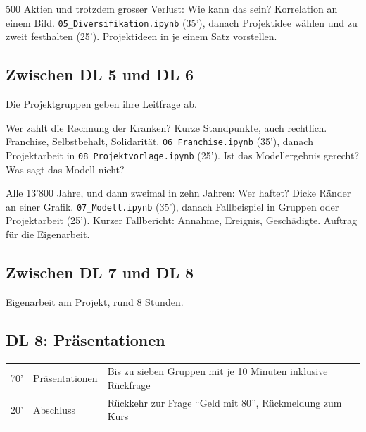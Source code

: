 {500 Aktien und trotzdem grosser Verlust: Wie kann das sein?}
{Korrelation an einem Bild.}
{\texttt{05\_Diversifikation.ipynb} (35'), danach Projektidee wählen und zu zweit festhalten (25').}
{Projektideen in je einem Satz vorstellen.}

\subsection*{Zwischen DL 5 und DL 6}
Die Projektgruppen geben ihre Leitfrage ab.

{Wer zahlt die Rechnung der Kranken? Kurze Standpunkte, auch rechtlich.}
{Franchise, Selbstbehalt, Solidarität.}
{\texttt{06\_Franchise.ipynb} (35'), danach Projektarbeit in \texttt{08\_Projektvorlage.ipynb} (25').}
{Ist das Modellergebnis gerecht? Was sagt das Modell nicht?}

{Alle 13'800 Jahre, und dann zweimal in zehn Jahren: Wer haftet?}
{Dicke Ränder an einer Grafik.}
{\texttt{07\_Modell.ipynb} (35'), danach Fallbeispiel in Gruppen oder Projektarbeit (25').}
{Kurzer Fallbericht: Annahme, Ereignis, Geschädigte. Auftrag für die Eigenarbeit.}

\subsection*{Zwischen DL 7 und DL 8}
Eigenarbeit am Projekt, rund 8 Stunden.

\subsection*{DL 8: Präsentationen}
\begin{center}
	\small
	\begin{tabular}{@{}p{}p{}p{}@{}}
		\midrule
		70' & Präsentationen & Bis zu sieben Gruppen mit je 10 Minuten inklusive Rückfrage \\
		20' & Abschluss & Rückkehr zur Frage \enquote{Geld mit 80}, Rückmeldung zum Kurs \\
		\midrule
	\end{tabular}
\end{center}
